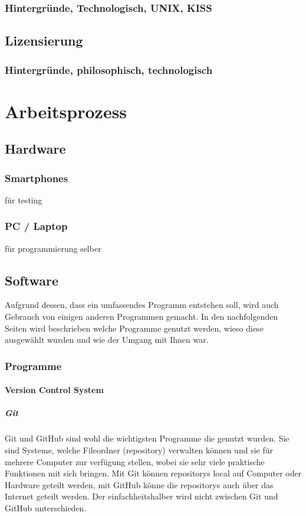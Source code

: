 \documentclass[a4paper,11pt]{article}
\begin{document}
\subsubsection{Hintergründe, Technologisch, UNIX, KISS}
\subsection{Lizensierung}
\subsubsection{Hintergründe, philosophisch, technologisch}

\section{Arbeitsprozess}

\subsection{Hardware}

\subsubsection{Smartphones}
für testing
\subsubsection{PC / Laptop}
für programmierung selber

\subsection{Software}

Aufgrund dessen, dass ein umfassendes Programm entstehen soll, wird auch Gebrauch von einigen anderen Programmen gemacht. In den nachfolgenden Seiten wird beschrieben welche Programme genutzt
werden, wieso diese ausgewählt wurden und wie der Umgang mit Ihnen war.  


\subsubsection{Programme}

\paragraph{Version Control System}
\subparagraph{Git}


Git und GitHub sind wohl die wichtigsten Programme die genutzt wurden. Sie sind Systeme, welche Fileordner (repository) verwalten können und sie für mehrere Computer zur verfügung stellen, 
wobei sie sehr viele praktische Funktionen mit sich bringen. Mit Git können repositorys local auf Computer oder Hardware geteilt werden, mit GitHub könne die repositorys auch 
über das Internet geteilt werden. Der einfachheitshalber wird nicht zwischen Git und GitHub unterschieden. 
\end{document}
